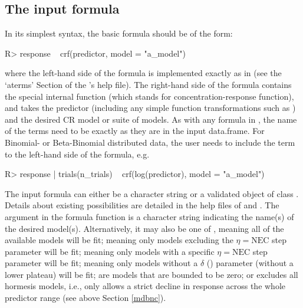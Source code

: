 \documentclass[
  shortnames]{jss}
\begin{document}
\hypertarget{the-input-formula}{%
\subsection{The input formula}\label{the-input-formula}}

In its simplest syntax, the basic  formula should be of the form:

\begin{CodeChunk}
\begin{CodeInput}
R> response ~ crf(predictor, model = "a_model")
\end{CodeInput}
\end{CodeChunk}

where the left-hand side of the formula is implemented exactly as in  (see the `aterms' Section of the 's help file). The right-hand side of the formula contains the special internal function  (which stands for concentration-response function), and takes the predictor (including any simple function transformations such as ) and the desired CR model or suite of models. As with any formula in , the name of the terms need to be exactly as they are in the input data.frame. For Binomial- or Beta-Binomial distributed data, the user needs to include the  term to the left-hand side of the formula, e.g.

\begin{CodeChunk}
\begin{CodeInput}
R> response | trials(n_trials) ~ crf(log(predictor), model = "a_model")
\end{CodeInput}
\end{CodeChunk}

The input formula can either be a character string or a validated object of class . Details about existing possibilities are detailed in the help files of  and . The argument  in the formula function  is a character string indicating the name(s) of the desired model(s). Alternatively, it may also be one of , meaning all of the available models will be fit;  meaning only models excluding the \(\eta = \text{NEC}\) step parameter will be fit;  meaning only models with a specific \(\eta = \text{NEC}\) step parameter will be fit;  meaning only models without a \(\delta\) () parameter (without a lower plateau) will be fit;  are models that are bounded to be zero; or  excludes all hormesis models, i.e., only allows a strict decline in response across the whole predictor range (see above Section \ref{mdbnc}).
\end{document}
